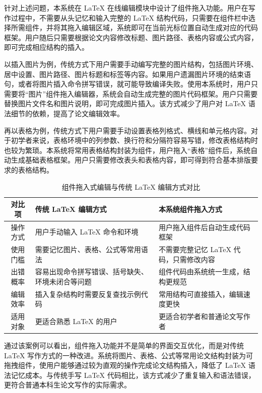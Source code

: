 \documentclass{xduugthesis}
\begin{document}
针对上述问题，本系统在 LaTeX 在线编辑模块中设计了组件拖入功能。用户在写作过程中，不需要从头记忆和输入完整的 LaTeX 结构代码，只需要在组件栏中选择所需组件，并将其拖入编辑区域，系统即可在当前光标位置自动生成对应的代码框架。用户随后只需要根据论文内容修改标题、图片路径、表格内容或公式内容，即可完成相应结构的插入。

以插入图片为例，传统方式下用户需要手动编写完整的图片结构，包括图片环境、居中设置、图片路径、图片标题和标签等内容。如果用户遗漏图片环境的结束语句，或者将图片插入命令拼写错误，就可能导致编译失败。使用本系统时，用户只需要将“图片”组件拖入编辑器，系统会自动生成完整的图片代码框架。用户只需要替换图片文件名和图片说明，即可完成图片插入。该方式减少了用户对 LaTeX 语法细节的依赖，提高了论文编辑效率。

再以表格为例，传统方式下用户需要手动设置表格列格式、横线和单元格内容。对于初学者来说，表格环境中的列参数、换行符和分隔符容易写错，修改表格结构时也较为繁琐。本系统将常用表格结构封装为组件，用户拖入“表格”组件后，系统自动生成基础表格框架。用户只需要修改表头和表格内容，即可得到符合基本排版要求的表格结构。

\begin{table}[!ht]
    \centering
    \caption{组件拖入式编辑与传统 LaTeX 编辑方式对比}
    \label{tab:drag-compare}
    \begin{tabular}{|c|p{5cm}|p{5cm}|}
        \hline
        对比项 & 传统 LaTeX 编辑方式 & 本系统组件拖入方式 \\
        \hline
        操作方式 & 用户手动输入 LaTeX 命令和环境 & 用户拖入组件后自动生成代码框架 \\
        \hline
        使用门槛 & 需要记忆图片、表格、公式等常用语法 & 不需要完整记忆 LaTeX 代码，只需修改内容 \\
        \hline
        出错概率 & 容易出现命令拼写错误、括号缺失、环境未闭合等问题 & 组件代码由系统统一生成，结构更规范 \\
        \hline
        编辑效率 & 插入复杂结构时需要反复查找示例代码 & 常用结构可直接插入，编辑速度更快 \\
        \hline
        适用对象 & 更适合熟悉 LaTeX 的用户 & 更适合初学者和普通论文写作者 \\
        \hline
    \end{tabular}
\end{table}

通过该案例可以看出，组件拖入功能并不是简单的界面交互优化，而是对传统 LaTeX 写作方式的一种改进。系统将图片、表格、公式等常用论文结构封装为可拖拽组件，使用户能够通过较为直观的操作完成论文结构插入，降低了 LaTeX 语法记忆成本。与传统手写 LaTeX 代码相比，该方式减少了重复输入和语法错误，更符合普通本科生论文写作的实际需求。
\end{document}
